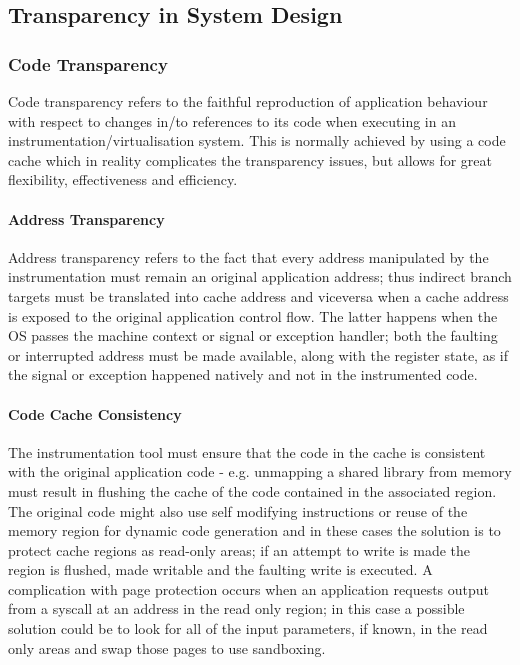 \subsection{Transparency in System Design}

\subsubsection{Code Transparency}
Code transparency refers to the faithful reproduction of application behaviour with respect to changes in/to
references to its code when executing in an instrumentation/virtualisation system. This is normally achieved by using a
code cache which in reality complicates the transparency issues, but allows for great flexibility, effectiveness and
efficiency.
\paragraph{Address Transparency} Address transparency refers to the fact that every address manipulated by the
instrumentation must remain an original application address; thus indirect branch targets must be translated into cache
address and viceversa when a cache address is exposed to the original application control flow. The latter happens when
the OS passes the machine context or signal or exception handler; both the faulting or interrupted address must be made
available, along with the register state, as if the signal or exception happened natively and not in the instrumented
code.
\paragraph{Code Cache Consistency} The instrumentation tool must ensure that the code in the cache is consistent with
the original application code - e.g. unmapping a shared library from memory must result in flushing the cache of the
code contained in the associated region. The original code might also use self modifying instructions or reuse of the
memory region for dynamic code generation and in these cases the solution is to protect cache regions as read-only
areas; if an attempt to write is made the region is flushed, made writable and the faulting write is executed. A
complication with page protection occurs when an application requests output from a syscall at an address in the read
only region; in this case a possible solution could be to look for all of the input parameters, if known, in the read
only areas and swap those pages to use sandboxing.

